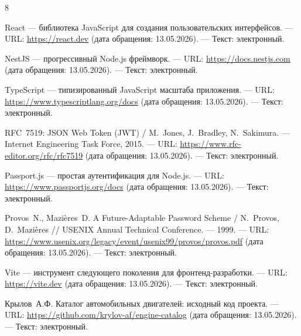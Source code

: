 \documentclass[14pt,a4paper]{extarticle}
\begin{document}
\newpage

\begin{thebibliography}{8}

React --- библиотека JavaScript для создания пользовательских интерфейсов. ---
URL: \url{https://react.dev} (дата обращения: 13.05.2026). --- Текст: электронный.

NestJS --- прогрессивный Node.js фреймворк. ---
URL: \url{https://docs.nestjs.com} (дата обращения: 13.05.2026). --- Текст: электронный.

TypeScript --- типизированный JavaScript масштаба приложения. ---
URL: \url{https://www.typescriptlang.org/docs} (дата обращения: 13.05.2026). --- Текст: электронный.

RFC~7519: JSON Web Token (JWT) / M.~Jones, J.~Bradley, N.~Sakimura. ---
Internet Engineering Task Force, 2015. ---
URL: \url{https://www.rfc-editor.org/rfc/rfc7519} (дата обращения: 13.05.2026). --- Текст: электронный.

Passport.js --- простая аутентификация для Node.js. ---
URL: \url{https://www.passportjs.org/docs} (дата обращения: 13.05.2026). --- Текст: электронный.

Provos~N., Mazi\`eres~D. A Future-Adaptable Password Scheme /
N.~Provos, D.~Mazi\`eres // USENIX Annual Technical Conference. --- 1999. ---
URL: \url{https://www.usenix.org/legacy/event/usenix99/provos/provos.pdf}
(дата обращения: 13.05.2026). --- Текст: электронный.

Vite --- инструмент следующего поколения для фронтенд-разработки. ---
URL: \url{https://vite.dev} (дата обращения: 13.05.2026). --- Текст: электронный.

Крылов~А.Ф. Каталог автомобильных двигателей: исходный код проекта. ---
URL: \url{https://github.com/krylov-af/engine-catalog}
(дата обращения: 13.05.2026). --- Текст: электронный.

\end{thebibliography}
\end{document}

